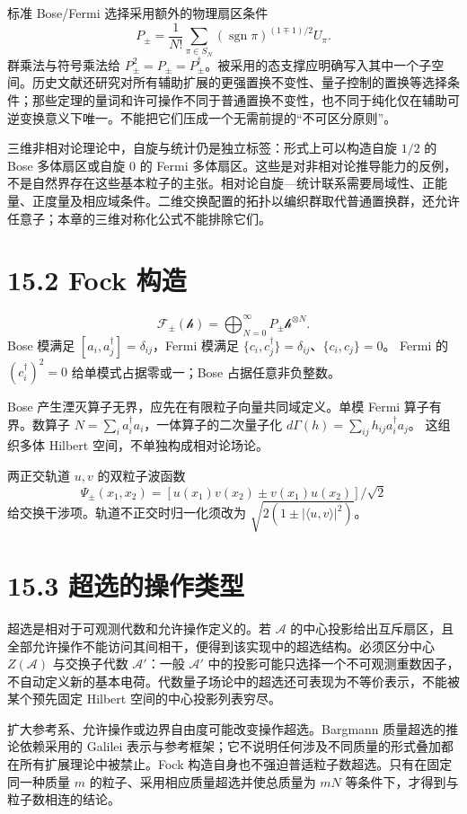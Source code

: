 \documentclass[
  11pt,
  oneside]{book}
\begin{document}
标准 Bose/Fermi 选择采用额外的物理扇区条件 \[
P_\pm=\frac1{N!}\sum_{\pi\in S_N}
(\operatorname{sgn}\pi)^{(1\mp1)/2}U_\pi.
\] 群乘法与符号乘法给
\(P_\pm^2=P_\pm=P_\pm^\dagger\)。被采用的态支撑应明确写入其中一个子空间。历史文献还研究对所有辅助扩展的更强置换不变性、量子控制的置换等选择条件；那些定理的量词和许可操作不同于普通置换不变性，也不同于纯化仅在辅助可逆变换意义下唯一。不能把它们压成一个无需前提的``不可区分原则''。

三维非相对论理论中，自旋与统计仍是独立标签：形式上可以构造自旋 \(1/2\)
的 Bose 多体扇区或自旋 \(0\) 的 Fermi
多体扇区。这些是对非相对论推导能力的反例，不是自然界存在这些基本粒子的主张。相对论自旋---统计联系需要局域性、正能量、正度量及相应域条件。二维交换配置的拓扑以编织群取代普通置换群，还允许任意子；本章的三维对称化公式不能排除它们。

\section{15.2 Fock 构造}

\[
\mathcal F_\pm(\mathcal h)=\bigoplus_{N=0}^\infty
P_\pm\mathcal h^{\otimes N}.
\] Bose 模满足 \([a_i,a_j^\dagger]=\delta_{ij}\)，Fermi 模满足
\(\{c_i,c_j^\dagger\}=\delta_{ij}\)、\(\{c_i,c_j\}=0\)。 Fermi 的
\((c_i^\dagger)^2=0\) 给单模式占据零或一；Bose 占据任意非负整数。

Bose 产生湮灭算子无界，应先在有限粒子向量共同域定义。单模 Fermi
算子有界。数算子 \(N=\sum_i a_i^\dagger a_i\)，一体算子的二次量子化
\(d\Gamma(h)=\sum_{ij}h_{ij}a_i^\dagger a_j\)。 这组织多体 Hilbert
空间，不单独构成相对论场论。

两正交轨道 \(u,v\) 的双粒子波函数 \[
\Psi_\pm(x_1,x_2)=
[u(x_1)v(x_2)\pm v(x_1)u(x_2)]/\sqrt2
\] 给交换干涉项。轨道不正交时归一化须改为
\(\sqrt{2(1\pm|\langle u,v\rangle|^2)}\)。

\section{15.3 超选的操作类型}

超选是相对于可观测代数和允许操作定义的。若 \(\mathcal A\)
的中心投影给出互斥扇区，且全部允许操作不能访问其间相干，便得到该实现中的超选结构。必须区分中心
\(Z(\mathcal A)\) 与交换子代数 \(\mathcal A'\)：一般 \(\mathcal A'\)
中的投影可能只选择一个不可观测重数因子，不自动定义新的基本电荷。代数量子场论中的超选还可表现为不等价表示，不能被某个预先固定
Hilbert 空间的中心投影列表穷尽。

扩大参考系、允许操作或边界自由度可能改变操作超选。Bargmann
质量超选的推论依赖采用的 Galilei
表示与参考框架；它不说明任何涉及不同质量的形式叠加都在所有扩展理论中被禁止。Fock
构造自身也不强迫普适粒子数超选。只有在固定同一种质量 \(m\)
的粒子、采用相应质量超选并使总质量为 \(mN\)
等条件下，才得到与粒子数相连的结论。
\end{document}
